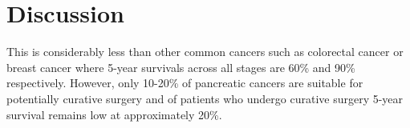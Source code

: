 



\section{Discussion}

 This is considerably less than other common cancers such as colorectal cancer or breast cancer where 5-year survivals across all stages are 60\% and 90\% respectively. However, only 10-20\% of pancreatic cancers are suitable for potentially curative surgery and of patients who undergo curative surgery 5-year survival remains low at approximately 20\%.\parencite{cancerresearchuk_cancer_2014}